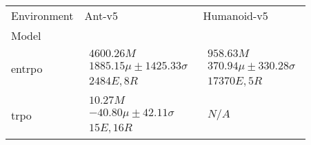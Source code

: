 \begin{tabular}{|l|p{6cm}|p{6cm}|}
\toprule
Environment & Ant-v5 & Humanoid-v5 \\
Model &  &  \\
\midrule
entrpo & $\begin{array}{c} 4600.26M \\ 1885.15\mu \pm 1425.33\sigma \\ 2484E, 8R \end{array}$ & $\begin{array}{c} 958.63M \\ 370.94\mu \pm 330.28\sigma \\ 17370E, 5R \end{array}$ \\
trpo & $\begin{array}{c} 10.27M \\ -40.80\mu \pm 42.11\sigma \\ 15E, 16R \end{array}$ & $\begin{array}{c} N/A \end{array}$ \\
\bottomrule
\end{tabular}
